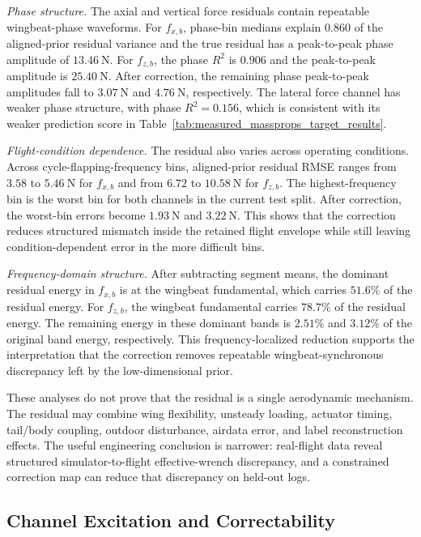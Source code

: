 \textit{Phase structure.} The axial and vertical force residuals contain repeatable wingbeat-phase waveforms. For $f_{x,b}$, phase-bin medians explain $0.860$ of the aligned-prior residual variance and the true residual has a peak-to-peak phase amplitude of $13.46~\mathrm{N}$. For $f_{z,b}$, the phase $R^2$ is $0.906$ and the peak-to-peak amplitude is $25.40~\mathrm{N}$. After correction, the remaining phase peak-to-peak amplitudes fall to $3.07~\mathrm{N}$ and $4.76~\mathrm{N}$, respectively. The lateral force channel has weaker phase structure, with phase $R^2=0.156$, which is consistent with its weaker prediction score in Table~\ref{tab:measured_massprops_target_results}.

\textit{Flight-condition dependence.} The residual also varies across operating conditions. Across cycle-flapping-frequency bins, aligned-prior residual RMSE ranges from $3.58$ to $5.46~\mathrm{N}$ for $f_{x,b}$ and from $6.72$ to $10.58~\mathrm{N}$ for $f_{z,b}$. The highest-frequency bin is the worst bin for both channels in the current test split. After correction, the worst-bin errors become $1.93~\mathrm{N}$ and $3.22~\mathrm{N}$. This shows that the correction reduces structured mismatch inside the retained flight envelope while still leaving condition-dependent error in the more difficult bins.

\textit{Frequency-domain structure.} After subtracting segment means, the dominant residual energy in $f_{x,b}$ is at the wingbeat fundamental, which carries $51.6\%$ of the residual energy. For $f_{z,b}$, the wingbeat fundamental carries $78.7\%$ of the residual energy. The remaining energy in these dominant bands is $2.51\%$ and $3.12\%$ of the original band energy, respectively. This frequency-localized reduction supports the interpretation that the correction removes repeatable wingbeat-synchronous discrepancy left by the low-dimensional prior.

These analyses do not prove that the residual is a single aerodynamic mechanism. The residual may combine wing flexibility, unsteady loading, actuator timing, tail/body coupling, outdoor disturbance, airdata error, and label reconstruction effects. The useful engineering conclusion is narrower: real-flight data reveal structured simulator-to-flight effective-wrench discrepancy, and a constrained correction map can reduce that discrepancy on held-out logs.

\subsection{Channel Excitation and Correctability}
\label{subsec:channel_correctability}

